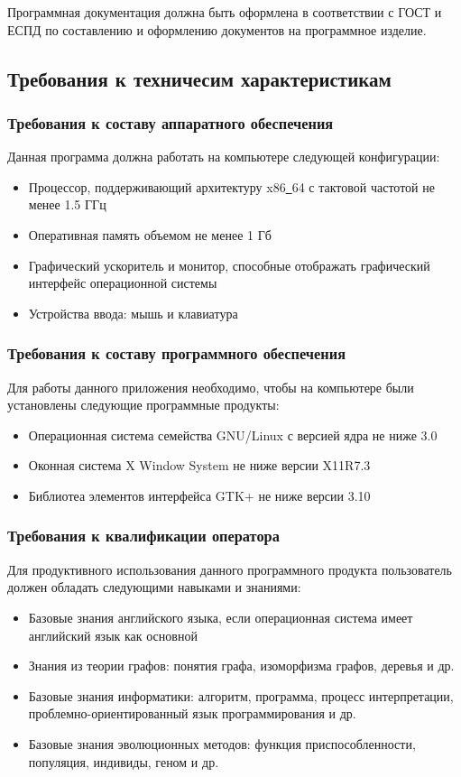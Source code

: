 \documentclass[russian,utf8,emptystyle]{eskdtext}
\begin{document}
Программная документация должна быть оформлена в соответствии с ГОСТ и ЕСПД по составлению и оформлению документов на программное изделие.

\subsection{Требования к техничесим характеристикам}
\subsubsection{Требования к составу аппаратного обеспечения}
Данная программа должна работать на компьютере следующей конфигурации:
\begin{itemize}
\item Процессор, поддерживающий архитектуру x86\underline{~}64 с тактовой частотой не менее 1.5 ГГц
\item Оперативная память объемом не менее 1 Гб
\item Графический ускоритель и монитор, способные отображать графический интерфейс операционной системы
\item Устройства ввода: мышь и клавиатура
\end{itemize}

\subsubsection{Требования к составу программного обеспечения}
Для работы данного приложения необходимо, чтобы на компьютере были установлены следующие программные продукты:
\begin{itemize}
\item Операционная система семейства GNU/Linux с версией ядра не ниже 3.0
\item Оконная система X Window System не ниже версии X11R7.3
\item Библиотеа элементов интерфейса GTK+ не ниже версии 3.10
\end{itemize}

\subsubsection{Требования к квалификации оператора}
Для продуктивного использования данного программного продукта пользователь должен обладать следующими навыками и знаниями:
\begin{itemize}
\item Базовые знания английского языка, если операционная система имеет английский язык как основной
\item Знания из теории графов: понятия графа, изоморфизма графов, деревья и др.
\item Базовые знания информатики: алгоритм, программа, процесс интерпретации, проблемно-ориентированный язык программирования и др.
\item Базовые знания эволюционных методов: функция приспособленности, популяция, индивиды, геном и др.
\end{itemize}
\end{document}

